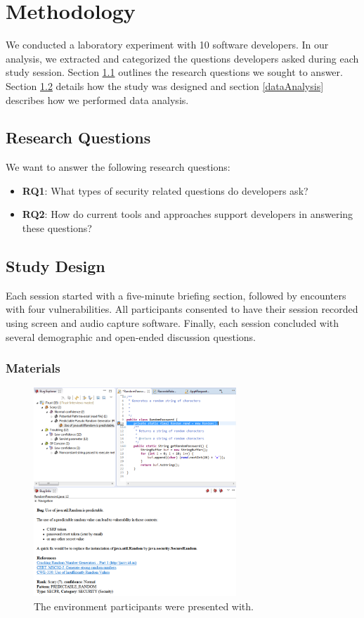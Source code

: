 \documentclass[conference]{IEEEtran}
\begin{document}
\section{Methodology}
\label{sec:meth}
We conducted a laboratory experiment with 10 software developers. In our analysis, we extracted and categorized the questions developers asked during each study session. 
Section \ref{rqs} outlines the research questions we sought to answer. 
Section \ref{studyDesign} details how the study was designed and section \ref{dataAnalysis} describes how we performed data analysis.


\subsection{Research Questions}
\label{rqs}
We want to answer the following research questions:
\begin{itemize}
\item \textbf{RQ1}: What types of security related questions do developers ask?
\item \textbf{RQ2}: How do current tools and approaches support developers in answering these questions?
\end{itemize}


\subsection{Study Design}
\label{studyDesign}
Each session started with a five-minute briefing section, followed by encounters with four vulnerabilities.
All participants consented to have their session recorded using screen and audio capture software.
Finally, each session concluded with several demographic and open-ended discussion questions.


\subsubsection{Materials}

\begin{figure}
\centering
\includegraphics[width=3in]{Images/environment.png}
\caption{The environment participants were presented with.}
\label{fig:environment} 
\end{figure}
	
\end{document}
